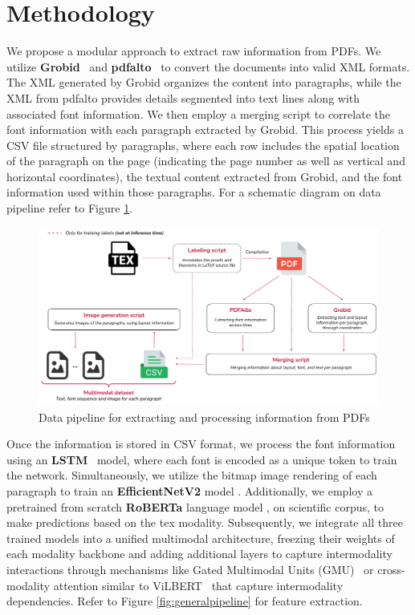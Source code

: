 \documentclass[runningheads]{llncs}
\begin{document}
\section{Methodology}
We propose a modular approach to extract raw information from PDFs. We utilize \textbf{Grobid}~\cite{GROBID} and \textbf{pdfalto}~\cite{pdfalto} to convert
the documents into valid XML formats. The XML generated by Grobid organizes the content into paragraphs,
while the XML from pdfalto provides details segmented into text lines along with associated font information.
We then employ a merging script to correlate the font information with each paragraph extracted by Grobid.
This process yields a CSV file structured by paragraphs, where each row includes the spatial location of the
paragraph on the page (indicating the page number as well as vertical and horizontal coordinates), the textual content
extracted from Grobid, and the font information used within those paragraphs. For a schematic diagram on data pipeline
refer to Figure \ref{fig:datapipeline}.

\begin{figure}[h]
	\centering
	\includegraphics[width=.9\textwidth]{images/preprocessing.pdf}
	\caption{Data pipeline for extracting and processing information from PDFs}
	\label{fig:datapipeline}
\end{figure}

Once the information is stored in CSV format, we process the font information using an \textbf{LSTM}~\cite{hochreiter1997long} model, where
each font is encoded as a unique token to train the network. Simultaneously, we utilize the bitmap image
rendering of each paragraph to train an \textbf{EfficientNetV2} model \cite{efficientnet}. Additionally, we employ a pretrained from scratch \textbf{RoBERTa} language model \cite{mishra:tel-04665528},
on scientific corpus, to make predictions based on the tex modality. Subsequently, we
integrate all three trained models into a unified multimodal architecture, freezing their weights of each modality backbone and adding
additional layers to capture intermodality interactions through mechanisms like Gated Multimodal Units
(GMU)~\cite{arevalo2020gated} or cross-modality attention similar to ViLBERT~\cite{DBLP:conf/nips/LuBPL19} that capture intermodality dependencies. Refer to Figure \ref{fig:generalpipeline} for feature extraction.
\end{document}
